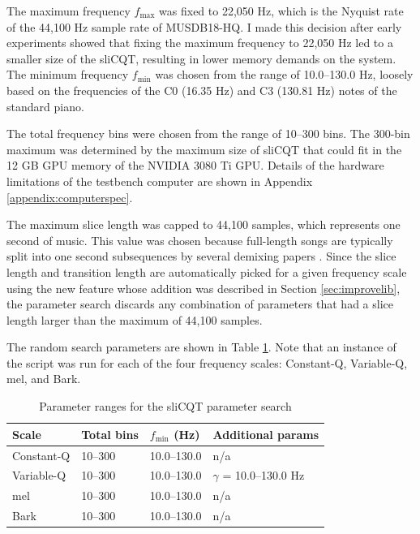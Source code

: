 \documentclass[report.tex]{subfiles}
\begin{document}
The maximum frequency $f_{\text{max}}$ was fixed to 22,050 Hz, which is the Nyquist rate of the 44,100 Hz sample rate of MUSDB18-HQ. I made this decision after early experiments showed that fixing the maximum frequency to 22,050 Hz led to a smaller size of the sliCQT, resulting in lower memory demands on the system. The minimum frequency $f_{\text{min}}$ was chosen from the range of 10.0--130.0 Hz, loosely based on the frequencies of the C0 (16.35 Hz) and C3 (130.81 Hz) notes of the standard piano.

The total frequency bins were chosen from the range of 10--300 bins. The 300-bin maximum was determined by the maximum size of sliCQT that could fit in the 12 GB GPU memory of the NVIDIA 3080 Ti GPU. Details of the hardware limitations of the testbench computer are shown in Appendix \ref{appendix:computerspec}.

The maximum slice length was capped to 44,100 samples, which represents one second of music. This value was chosen because full-length songs are typically split into one second subsequences by several demixing papers \parencite{plumbley1, plumbley2, demucs}. Since the slice length and transition length are automatically picked for a given frequency scale using the new feature whose addition was described in Section \ref{sec:improvelib}, the parameter search discards any combination of parameters that had a slice length larger than the maximum of 44,100 samples.

The random search parameters are shown in Table \ref{table:slicqparams}. Note that an instance of the script was run for each of the four frequency scales: Constant-Q, Variable-Q, mel, and Bark.

\begin{table}[ht]
	\centering
	\caption{Parameter ranges for the sliCQT parameter search}
	\label{table:slicqparams}
\begin{tabular}{ |l|l|l|l| }
	 \hline
	 Scale & Total bins & $f_{\text{min}}$ (Hz) & Additional params \\
	 \hline
	 \hline
	 Constant-Q & 10--300 & 10.0--130.0 & n/a \\
	 \hline
	 Variable-Q & 10--300 & 10.0--130.0 & $\gamma$ = 10.0--130.0 Hz \\
	 \hline
	 mel & 10--300 & 10.0--130.0 & n/a \\
	 \hline
	 Bark & 10--300 & 10.0--130.0 & n/a \\
	 \hline
\end{tabular}
\end{table}
\end{document}
